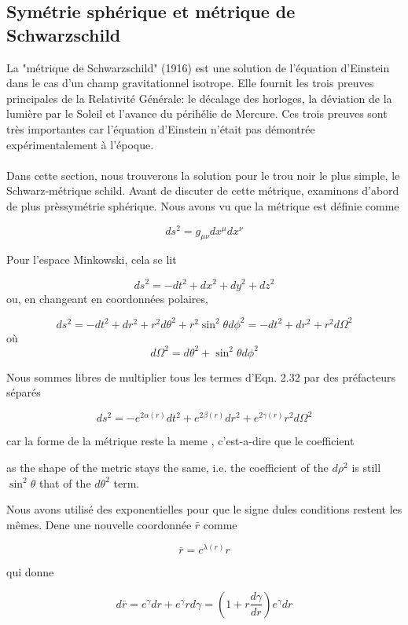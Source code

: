 	
	
	\subsection{ Symétrie sphérique et métrique de Schwarzschild }
	La "métrique de Schwarzschild" (1916) est une solution de l'équation d'Einstein dans le cas d'un champ gravitationnel isotrope. Elle fournit les trois preuves principales de la Relativité Générale: le décalage des horloges, la déviation de la lumière par le Soleil et l'avance du périhélie de Mercure. Ces trois preuves sont très importantes car l'équation d'Einstein n'était pas démontrée expérimentalement à l'époque.\\
	\\
	
	Dans cette section, nous trouverons la solution pour le trou noir le plus simple, le Schwarz-métrique schild. Avant de discuter de cette métrique, examinons d'abord de plus prèssymétrie sphérique. Nous avons vu que la métrique est définie comme
	
	$$
d s^{2}=g_{\mu \nu} d x^{\mu} d x^{\nu}
$$

Pour l'espace Minkowski, cela se lit

$$
d s^{2}=-d t^{2}+d x^{2}+d y^{2}+d z^{2}
$$
ou, en changeant en coordonnées polaires,

$$
d s^{2}=-d t^{2}+d r^{2}+r^{2} d \theta^{2}+r^{2} \sin ^{2} \theta d \phi^{2}=-d t^{2}+d r^{2}+r^{2} d \Omega^{2}
$$
où
$$
d \Omega^{2}=d \theta^{2}+\sin ^{2} \theta d \phi^{2}
$$
	
Nous sommes libres de multiplier tous les termes d'Eqn. 2.32 par des préfacteurs séparés

$$
d s^{2}=-e^{2 \alpha(r)} d t^{2}+e^{2 \beta(r)} d r^{2}+e^{2 \gamma(r)} r^{2} d \Omega^{2}
$$


car la forme de la métrique reste la meme , c'est-a-dire que le coefficient

as the shape of the metric stays the same, i.e. the coefficient of the $d \rho^{2}$ is still $\sin ^{2} \theta$ that of the $d \theta^{2}$ term.

 
 Nous avons utilisé des exponentielles pour que le signe dules conditions restent les mêmes. Dene une nouvelle coordonnée $
\bar{r}$ comme

 $$
\bar{r}=c^{\lambda(r)} r
$$

qui donne 

$$
d \bar{r}=e^{\gamma} d r+e^{\gamma} r d \gamma=\left(1+r \frac{d \gamma}{d r}\right) e^{\gamma} d r
$$


